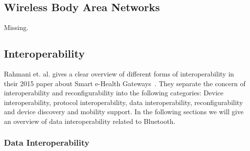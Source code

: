 



\subsection{Wireless Body Area Networks} %
\label{sub:wireless_body_area_networks}

Missing.


\subsection{Interoperability} %
\label{sub:interoperability}

Rahmani et. al. gives a clear overview of different forms of interoperability in their 2015 paper about Smart e-Health Gateways~\cite{DrAmirMohammadRahmani:2014vx}. They separate the concern of interoperability and reconfigurability into the following categories: Device interoperability, protocol interoperability, data interoperability, reconfigurability and device discovery and mobility support. In the following sections we will give an overview of data interoperability related to Bluetooth.

\subsubsection{Data Interoperability} %
\label{ssub:data_interoperability}

